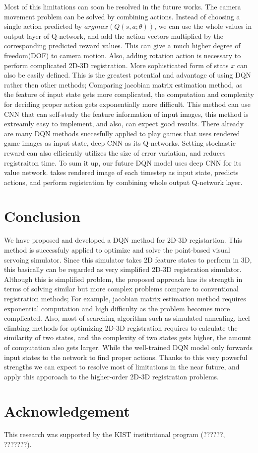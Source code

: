 \documentclass[10pt]{article}
\begin{document}
  Most of this limitations can soon be resolved in the future works. The camera movement problem can be solved by combining actions. Instead of choosing a single action predicted by $argmax(Q(s, a; \theta ))$, we can use the whole values in output layer of Q-network, and add the action vectors multiplied by the corresponding predicted reward values. This can give a much higher degree of freedom(DOF) to camera motion. Also, adding rotation action is necessary to perform complicated 2D-3D registration. More sophisticated form of stats $x$ can also be easily defined. This is the greatest potential and advantage of using DQN rather then other methods; Comparing jacobian matrix estimation method, as the feature of input state gets more complicated, the computation and complexity for deciding proper action gets exponentially more difficult.
  This method can use CNN that can self-study the feature information of input images, this method is extreamly easy to implement, and also, can expect good results. There already are many DQN methods succesfully applied to play games that uses rendered game images as input state, deep CNN as its Q-networks\cite{ref2}. Setting stochastic reward can also efficiently utilizes the size of error variation, and reduces registraiton time. To sum it up, our future DQN model uses deep CNN for its value network. takes rendered image of each timestep as input state, predicts actions, and perform registration by combining whole output Q-network layer.



\section{Conclusion}

We have proposed and developed a DQN method for 2D-3D registartion. This method is successfuly applied to optimize and solve the point-based visual servoing simulator. Since this simulator takes 2D feature states to perform in 3D, this basically can be regarded as very simplified 2D-3D registration simulator. Although this is simplified problem, the proposed approach has its strength in terms of solving similar but more complex problems compare to conventional registration methods; For example, jacobian matrix estimation method requires exponential computation and high difficulty as the problem becomes more complicated. Also, most of searching algorithm such as simulated annealing, heel climbing methods for optimizing 2D-3D registration requires to calculate the similarity of two states, and the complexity of two states gets higher, the amount of computation also gets larger. While the well-trained DQN model only forwards input states to the network to find proper actions. Thanks to this very powerful strengths we can expect to resolve most of limitations in the near future, and apply this apporoach to the higher-order 2D-3D registration problems.


\section*{Acknowledgement}
This research was supported by the KIST institutional program (??????, ???????).


\newpage


\end{document}

